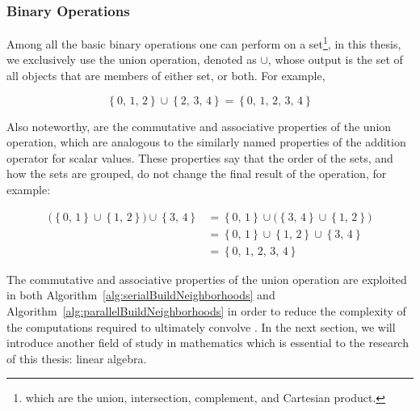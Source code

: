 %
%
\subsubsection{Binary Operations}
\label{ch2sETBssSTsssBO}
Among all the basic binary operations one can perform on a set\footnote{which are the union, intersection, complement, and Cartesian product.}, in this thesis, we exclusively use the union operation, denoted as $\cup$, whose output is the set of all objects that are members of either set, or both. For example,

\begin{equation}
	\left \{0,\,1,\,2\right \} \cup \left \{2,\,3,\,4\right \} = \left \{0,\,1,\,2,\,3,\,4\right \}
\end{equation}

Also noteworthy, are the commutative and associative properties of the union operation, which are analogous to the similarly named properties of the addition operator for scalar values. These properties say that the order of the sets, and how the sets are grouped, do not change the final result of the operation, for example:

\begin{equation}
\begin{aligned}
	\big( \left \{0,\,1\right \} \cup \left \{1,\,2\right \} \big) \cup \left \{3,\,4\right \} & = \left \{0,\,1\right \} \cup \big( \left \{3,\,4\right \} \cup \left \{1,\,2\right \}\big) \\
	& = \left \{0,\,1\right \} \cup \left \{1,\,2\right \} \cup \left \{3,\,4\right \} \\
	& = \left \{0,\,1,\,2,\,3,\,4\right \}
	\label{eq:ascAndComPropertiesOfUnions}
\end{aligned}
\end{equation}

The commutative and associative properties of the union operation are exploited in both Algorithm~\ref{alg:serialBuildNeighborhoods} and Algorithm~\ref{alg:parallelBuildNeighborhoods} in order to reduce the complexity of the computations required to ultimately convolve . In the next section, we will introduce another field of study in mathematics which is essential to the research of this thesis: linear algebra.

%
%
%
%
